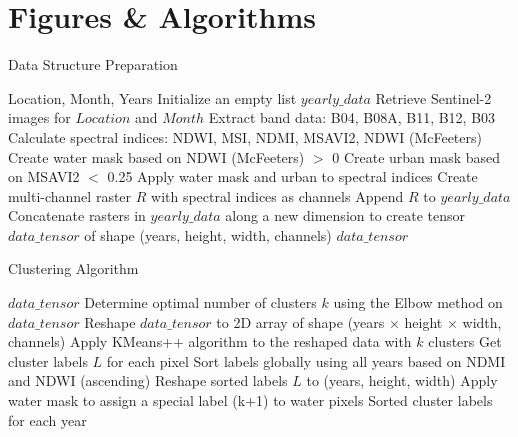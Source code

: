\documentclass[10pt,twocolumn]{article}
\begin{document}



\onecolumn
\newpage
\appendix
\section{Figures \& Algorithms}
\begin{algorithm*}[h]
  \caption{Data Structure Preparation}
  \label{alg:data_prep}
  \begin{algorithmic}[1]
      \Require Location, Month, Years
      \State Initialize an empty list $yearly\_data$
          \State Retrieve Sentinel-2 images for $Location$ and $Month$
              \State Extract band data: B04, B08A, B11, B12, B03
              \State Calculate spectral indices: NDWI, MSI, NDMI, MSAVI2, NDWI (McFeeters)
              \State Create water mask based on NDWI (McFeeters) $>$ 0
              \State Create urban mask based on MSAVI2 $<$ 0.25 
              \State Apply water mask and urban to spectral indices
              \State Create multi-channel raster $R$ with spectral indices as channels
          \EndFor 
          \State Append $R$ to $yearly\_data$
      \EndFor
      \State Concatenate rasters in $yearly\_data$ along a new dimension to create tensor $data\_tensor$ of shape (years, height, width, channels)
      \State \Return $data\_tensor$
  \end{algorithmic}
\end{algorithm*}

\begin{algorithm*}[h]
    \caption{Clustering Algorithm}
    \label{alg:clustering}
    \begin{algorithmic}[1]
        \Require $data\_tensor$
        \State Determine optimal number of clusters $k$ using the Elbow method on $data\_tensor$
        \State Reshape $data\_tensor$ to 2D array of shape (years $\times$ height $\times$ width, channels)
        \State Apply KMeans++ algorithm to the reshaped data with $k$ clusters
        \State Get cluster labels $L$ for each pixel
        \State Sort labels globally using all years based on NDMI and NDWI (ascending)
        \State Reshape sorted labels $L$ to (years, height, width)
            \State Apply water mask to assign a special label (k+1) to water pixels
        \EndFor
        \State \Return Sorted cluster labels for each year
    \end{algorithmic}
\end{algorithm*}
\twocolumn
\end{document}
